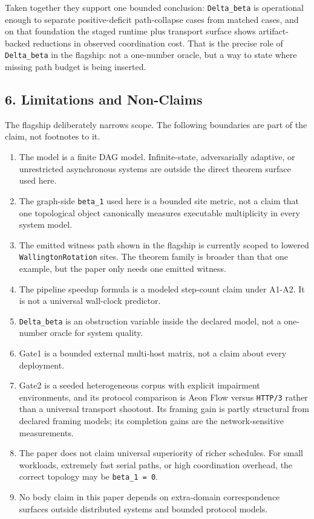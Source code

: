 \documentclass[
  11pt,
]{article}
\providecommand{\tightlist}{%
  \setlength{\itemsep}{0pt}\setlength{\parskip}{0pt}}
\begin{document}
Taken together they support one bounded conclusion: \texttt{Delta\_beta}
is operational enough to separate positive-deficit path-collapse cases
from matched cases, and on that foundation the staged runtime plus
transport surface shows artifact-backed reductions in observed
coordination cost. That is the precise role of \texttt{Delta\_beta} in
the flagship: not a one-number oracle, but a way to state where missing
path budget is being inserted.

\subsection{6. Limitations and
Non-Claims}\label{limitations-and-non-claims}

The flagship deliberately narrows scope. The following boundaries are
part of the claim, not footnotes to it.

\begin{enumerate}
\def\labelenumi{\arabic{enumi}.}
\tightlist
\item
  The model is a finite DAG model. Infinite-state, adversarially
  adaptive, or unrestricted asynchronous systems are outside the direct
  theorem surface used here.
\item
  The graph-side \texttt{beta\_1} used here is a bounded site metric,
  not a claim that one topological object canonically measures
  executable multiplicity in every system model.
\item
  The emitted witness path shown in the flagship is currently scoped to
  lowered \texttt{WallingtonRotation} sites. The theorem family is
  broader than that one example, but the paper only needs one emitted
  witness.
\item
  The pipeline speedup formula is a modeled step-count claim under
  A1-A2. It is not a universal wall-clock predictor.
\item
  \texttt{Delta\_beta} is an obstruction variable inside the declared
  model, not a one-number oracle for system quality.
\item
  Gate1 is a bounded external multi-host matrix, not a claim about every
  deployment.
\item
  Gate2 is a seeded heterogeneous corpus with explicit impairment
  environments, and its protocol comparison is Aeon Flow versus
  \texttt{HTTP/3} rather than a universal transport shootout. Its
  framing gain is partly structural from declared framing models; its
  completion gains are the network-sensitive measurements.
\item
  The paper does not claim universal superiority of richer schedules.
  For small workloads, extremely fast serial paths, or high coordination
  overhead, the correct topology may be \texttt{beta\_1\ =\ 0}.
\item
  No body claim in this paper depends on extra-domain correspondence
  surfaces outside distributed systems and bounded protocol models.
\end{enumerate}
\end{document}
